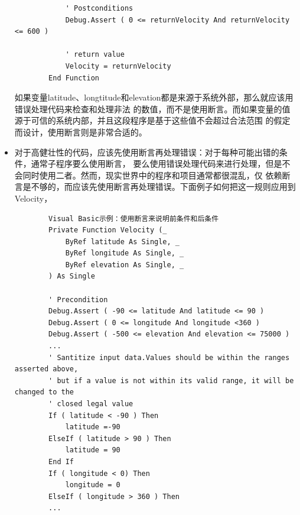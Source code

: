 \documentclass{article}
\begin{document}
\begin{itemize}
\begin{lstlisting}
            ' Postconditions
            Debug.Assert ( 0 <= returnVelocity And returnVelocity <= 600 )

            ' return value
            Velocity = returnVelocity
        End Function
    \end{lstlisting}
    如果变量latitude、longtitude和elevation都是来源于系统外部，那么就应该用错误处理代码来检查和处理非法
    的数值，而不是使用断言。而如果变量的值源于可信的系统内部，并且这段程序是基于这些值不会超过合法范围
    的假定而设计，使用断言则是非常合适的。
    \item 对于高健壮性的代码，应该先使用断言再处理错误：对于每种可能出错的条件，通常子程序要么使用断言，
    要么使用错误处理代码来进行处理，但是不会同时使用二者。然而，现实世界中的程序和项目通常都很混乱，仅
    依赖断言是不够的，而应该先使用断言再处理错误。下面例子如何把这一规则应用到Velocity，
    \begin{lstlisting}
        Visual Basic示例：使用断言来说明前条件和后条件
        Private Function Velocity (_
            ByRef latitude As Single, _
            ByRef longitude As Single, _
            ByRef elevation As Single, _
        ) As Single

        ' Precondition
        Debug.Assert ( -90 <= latitude And latitude <= 90 )
        Debug.Assert ( 0 <= longitude And longitude <360 )
        Debug.Assert ( -500 <= elevation And elevation <= 75000 )
        ...
        ' Santitize input data.Values should be within the ranges asserted above,
        ' but if a value is not within its valid range, it will be changed to the
        ' closed legal value
        If ( latitude < -90 ) Then
            latitude =-90
        ElseIf ( latitude > 90 ) Then
            latitude = 90
        End If
        If ( longitude < 0) Then
            longitude = 0
        ElseIf ( longitude > 360 ) Then
        ...
    \end{lstlisting} 
\end{itemize}
\end{document}
